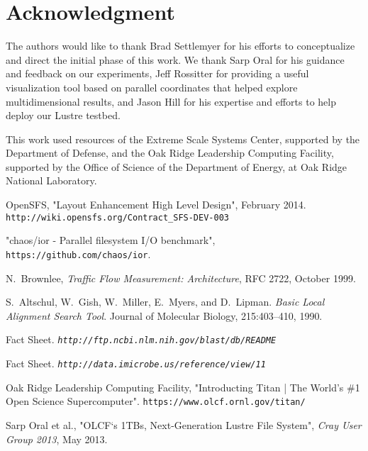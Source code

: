 \documentclass[conference,compsoc]{IEEEtran}
\begin{document}
\section*{Acknowledgment}
\fi

The authors would like to thank Brad Settlemyer for his efforts to conceptualize and direct the initial phase of this work. 
We thank Sarp Oral for his guidance and feedback on our experiments, Jeff Rossitter for providing a useful visualization tool based on parallel coordinates that helped explore multidimensional results, and Jason Hill for his expertise and efforts to help deploy our Lustre testbed.

This work used resources of the Extreme Scale Systems Center, supported 
by the Department of Defense, and the Oak Ridge Leadership Computing 
Facility, supported by the Office of Science of the Department of 
Energy, at Oak Ridge National Laboratory.





\begin{thebibliography}{1}

OpenSFS, "Layout Enhancement High Level Design", February 2014. \texttt{http://wiki.opensfs.org/Contract\_SFS-DEV-003}

"chaos/ior - Parallel filesystem I/O benchmark", \texttt{https://github.com/chaos/ior}.

N.~Brownlee, \emph{Traffic Flow Measurement: Architecture}, RFC 2722, October 1999.

S.~Altschul, W.~Gish, W.~Miller, E.~Myers, and D.~Lipman. \emph{Basic Local Alignment Search Tool}.
Journal of Molecular Biology, 215:403–410, 1990.

Fact Sheet. \emph{\texttt{http://ftp.ncbi.nlm.nih.gov/blast/db/README}}

Fact Sheet. \emph{\texttt{http://data.imicrobe.us/reference/view/11}}

Oak Ridge Leadership Computing Facility, "Introducting Titan | The World's \#1 Open Science Supercomputer". \texttt{https://www.olcf.ornl.gov/titan/}

Sarp Oral et al., "OLCF`s 1TBs, Next-Generation Lustre File System", \emph{Cray User Group 2013}, May 2013.



\end{thebibliography}
\end{document}
